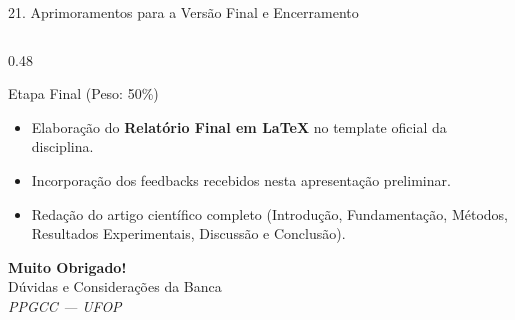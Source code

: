 \documentclass[aspectratio=169, 10pt]{beamer}
\begin{document}
\begin{frame}{21. Aprimoramentos para a Versão Final e Encerramento}
\begin{columns}[T]
        \begin{column}{0.48\textwidth}
            \begin{exampleblock}{Etapa Final (Peso: 50\%)}
                \begin{itemize}\setlength{\itemsep}{5pt}\small
                    \item Elaboração do \textbf{Relatório Final em LaTeX} no template oficial da disciplina.
                    \item Incorporação dos feedbacks recebidos nesta apresentação preliminar.
                    \item Redação do artigo científico completo (Introdução, Fundamentação, Métodos, Resultados Experimentais, Discussão e Conclusão).
                \end{itemize}
            \end{exampleblock}

            \vspace{6pt}
            \begin{center}
                \textbf{\large Muito Obrigado!} \\
                \medskip
                {\small Dúvidas e Considerações da Banca} \\
                \medskip
                \textit{PPGCC --- UFOP}
            \end{center}
        \end{column}
    \end{columns}
\end{frame}
\end{document}
